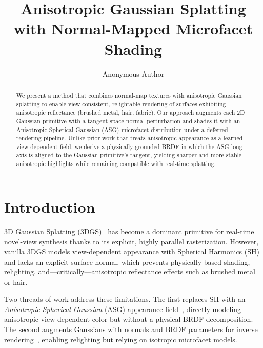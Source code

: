 \documentclass[acmtog, review=true, authorversion=false]{acmart}
\begin{document}
\title{Anisotropic Gaussian Splatting with Normal-Mapped Microfacet Shading}

\author{Anonymous Author}

\begin{abstract}
We present a method that combines normal-map textures with anisotropic
Gaussian splatting to enable view-consistent, relightable rendering of
surfaces exhibiting anisotropic reflectance (brushed metal, hair, fabric).
Our approach augments each 2D Gaussian primitive with a tangent-space
normal perturbation and shades it with an Anisotropic Spherical Gaussian
(ASG) microfacet distribution under a deferred rendering pipeline. Unlike
prior work that treats anisotropic appearance as a learned view-dependent
field, we derive a physically grounded BRDF in which the ASG long axis is
aligned to the Gaussian primitive's tangent, yielding sharper and more
stable anisotropic highlights while remaining compatible with real-time
splatting.
\end{abstract}



\maketitle

\section{Introduction}\label{sec:intro}

3D Gaussian Splatting (3DGS)~\cite{kerbl3Dgaussians} has become a
dominant primitive for real-time novel-view synthesis thanks to its
explicit, highly parallel rasterization. However, vanilla 3DGS models
view-dependent appearance with Spherical Harmonics (SH) and lacks an
explicit surface normal, which prevents physically-based shading,
relighting, and---critically---anisotropic reflectance effects such as
brushed metal or hair.

Two threads of work address these limitations. The first replaces SH
with an \emph{Anisotropic Spherical Gaussian} (ASG) appearance
field~\cite{specgaussian,glossgau}, directly modeling anisotropic
view-dependent color but without a physical BRDF decomposition. The
second augments Gaussians with normals and BRDF parameters for
inverse rendering~\cite{gsir,relightable3dgaussians,deferredgs}, enabling
relighting but relying on isotropic microfacet models.
\end{document}
